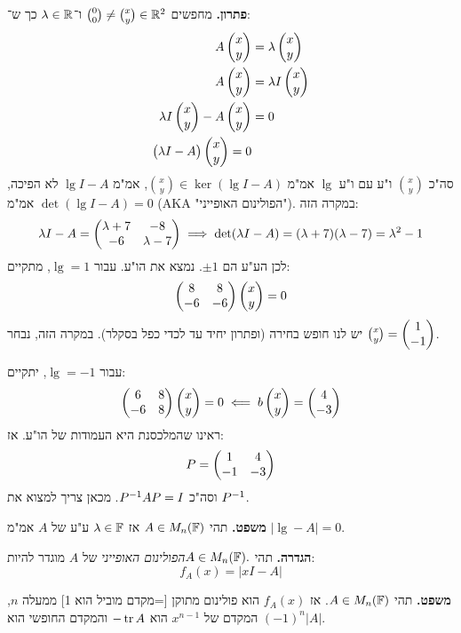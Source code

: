 \documentclass[]{../../../../tex/classes/styledArticle}
\begin{document}
	\textbf{פתרון. }מחפשים $\binom{0}{0} \neq \binom{x}{y} \in \mathbb{R}^2$ ו־$\lambda \in \mathbb{R}$ כך ש־: 
	\begin{align*}
		A\begin{pmatrix} x \\ y \end{pmatrix} &= \lambda \begin{pmatrix} x \\ y \end{pmatrix} \\
		A\begin{pmatrix} x \\ y \end{pmatrix} &= \lambda I \begin{pmatrix} x \\ y \end{pmatrix} \\
		\lambda I \begin{pmatrix} x \\ y \end{pmatrix} - A \begin{pmatrix} x \\ y \end{pmatrix} &= 0 \\
		\begin{pmatrix} \lambda I - A \end{pmatrix} \begin{pmatrix} x \\ y \end{pmatrix} = 0
	\end{align*}
	סה"כ $\binom{x}{y}$ ו"ע עם ו"ע $\lg$ אמ"מ $\binom{x}{y} \in \ker (\lg I - A)$, אמ"מ $\lg I - A$ לא הפיכה, אמ"מ $\det(\lg I - A) = 0$ (AKA "הפולינום האופייני"). במקרה הזה: 
	\[ \lambda I - A = \begin{pmatrix} \lambda + 7 & -8 \\ -6 & \lambda - 7 \end{pmatrix} \implies \det(\lambda I - A) = (\lambda + 7)(\lambda - 7) = \lambda^2 - 1 \]
	לכן הע"ע הם $\pm 1$. נמצא את הו"ע. עבור $\lg = 1$, מתקיים: 
	\[ \begin{pmatrix} 8 & 8 \\ -6 & -6 \end{pmatrix}\begin{pmatrix} x \\ y \end{pmatrix} = 0 \]
	יש לנו חופש בחירה (ופתרון יחיד עד לכדי כפל בסקלר). במקרה הזה, נבחר $\binom{x}{y} = \begin{pmatrix} 1 \\ -1 \end{pmatrix}$. 
	
	עבור $\lg = -1$, יתקיים: 
	\[ \begin{pmatrix} 6 & 8 \\ -6 & 8 \end{pmatrix}\begin{pmatrix} x \\ y \end{pmatrix} = 0 \impliedby b\begin{pmatrix} x \\ y \end{pmatrix} = \begin{pmatrix} 4 \\ -3 \end{pmatrix} \]
	ראינו שהמלכסנת היא העמודות של הו"ע. אז: 
	\[ P = \begin{pmatrix} 1 & 4 \\ -1 & -3 \end{pmatrix} \]
	וסה"כ $P^{-1} A P = I$. מכאן צריך למצוא את $P^{-1}$. 
	
	\textbf{משפט. }תהי $A \in M_n(\mathbb{F})$ אז $\lambda \in \mathbb{F}$ ע"ע של $A$ אמ"מ $|\lg - A| = 0$. 
	
	\textbf{הגדרה. }תהי $A \in M_n(\mathbb{F}). $\textit{הפולינום האופייני} של $A$ מוגדר להיות: 
	\[ f_A(x) = |xI - A| \]
	
	\textbf{משפט. }תהי $A \in M_n(\mathbb{F})$. אז $f_A(x)$ הוא פולינום מתוקן [=מקדם מוביל הוא 1] ממעלה $n$, המקדם של $x^{n - 1}$ הוא $- \operatorname{tr} A$ והמקדם החופשי הוא $(-1)^{n}|A|$. 
	
	
	
	
\end{document}
